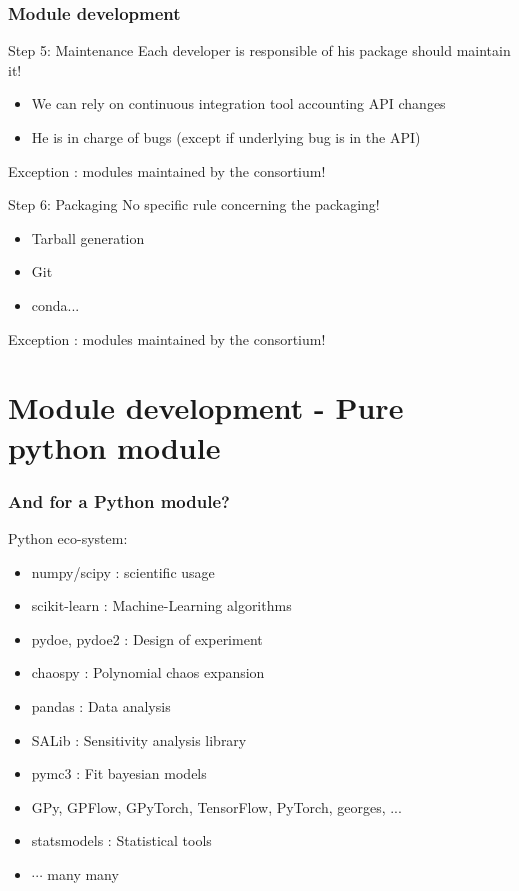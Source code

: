 \documentclass[8pt]{beamer}
\begin{document}
\begin{frame}
  \frametitle{Module development}
  \begin{block}{Step 5: Maintenance}
    Each developer is responsible of his package should maintain it!
    \begin{itemize}
    \item We can rely on continuous integration tool accounting API changes
    \item He is in charge of bugs (except if underlying bug is in the API)
    \end{itemize}
    Exception : modules maintained by the consortium!
  \end{block}
  
  \begin{block}{Step 6: Packaging}
    No specific rule concerning the packaging!
    \begin{itemize}
    \item Tarball generation
    \item Git
    \item conda...
    \end{itemize}
    Exception : modules maintained by the consortium!
  \end{block}
\end{frame}


\section[Module development]{Module development - Pure python module}
  \begin{frame}[containsverbatim]
    \frametitle{And for a Python module?}
        
    Python eco-system:
    \begin{itemize}
    \item \alert{numpy/scipy} : scientific usage 
    \item \alert{scikit-learn} : Machine-Learning algorithms
    \item \alert{pydoe, pydoe2} : Design of experiment
    \item \alert{chaospy} : Polynomial chaos expansion
    \item \alert{pandas} : Data analysis
    \item \alert{SALib} : Sensitivity analysis library
    \item \alert{pymc3} : Fit bayesian models
    \item \alert{GPy, GPFlow, GPyTorch, TensorFlow, PyTorch, georges, ... }
    \item \alert{statsmodels} : Statistical tools
    \item $\cdots$ many many 
    \end{itemize}
    \end{frame}
\end{document}
